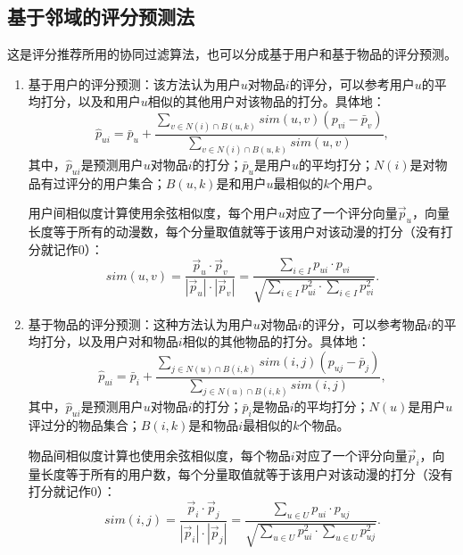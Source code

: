     \subsection{基于邻域的评分预测法}
    这是评分推荐所用的协同过滤算法，也可以分成基于用户和基于物品的评分预测。
    \begin{enumerate}
      \item 基于用户的评分预测：该方法认为用户$u$对物品$i$的评分，可以参考用户$u$的平均打分，以及和用户$u$相似的其他用户对该物品的打分。具体地：
      \begin{equation}
      \hat{p}_{ui}=\bar{p}_u+\frac{\sum\limits_{v\in N(i)\cap B(u,k)}sim(u,v)(p_{vi}-\bar{p}_v)}{\sum\limits_{v\in N(i)\cap B(u,k)}sim(u,v)},
      \end{equation}
      其中，$\hat{p}_{ui}$是预测用户$u$对物品$i$的打分；$\bar{p}_u$是用户$u$的平均打分；$N(i)$是对物品有过评分的用户集合；$B(u,k)$是和用户$u$最相似的$k$个用户。
      
      用户间相似度计算使用余弦相似度，每个用户$u$对应了一个评分向量$\vec{p}_u$，向量长度等于所有的动漫数，每个分量取值就等于该用户对该动漫的打分（没有打分就记作$0$）：
      \begin{equation}
      sim(u,v)=\frac{\vec{p}_u\cdot\vec{p}_v}{|\vec{p}_u|\cdot |\vec{p}_v|}=\frac{\sum\limits_{i\in I}p_{ui}\cdot p_{vi}}{\sqrt{\sum\limits_{i\in I}p_{ui}^2\cdot \sum\limits_{i\in I}p_{vi}^2}}.
      \end{equation}
      
      \item 基于物品的评分预测\cite{sarwar2001item}：这种方法认为用户$u$对物品$i$的评分，可以参考物品$i$的平均打分，以及用户对和物品$i$相似的其他物品的打分。具体地：
      \begin{equation}
      \hat{p}_{ui}=\bar{p}_i+\frac{\sum\limits_{j\in N(u)\cap B(i,k)}sim(i,j)(p_{uj}-\bar{p}_j)}{\sum\limits_{j\in N(u)\cap B(i,k)}sim(i,j)},
      \end{equation}
      其中，$\hat{p}_{ui}$是预测用户$u$对物品$i$的打分；$\bar{p}_i$是物品$i$的平均打分；$N(u)$是用户$u$评过分的物品集合；$B(i,k)$是和物品$i$最相似的$k$个物品。
      
      物品间相似度计算也使用余弦相似度，每个物品$i$对应了一个评分向量$\vec{p}_i$，向量长度等于所有的用户数，每个分量取值就等于该用户对该动漫的打分（没有打分就记作$0$）：
      \begin{equation}
      sim(i,j)=\frac{\vec{p}_i\cdot\vec{p}_j}{|\vec{p}_i|\cdot |\vec{p}_j|}=\frac{\sum\limits_{u\in U}p_{ui}\cdot p_{uj}}{\sqrt{\sum\limits_{u\in U}p_{ui}^2\cdot \sum\limits_{u\in U}p_{uj}^2}}.
      \end{equation}
    \end{enumerate}

